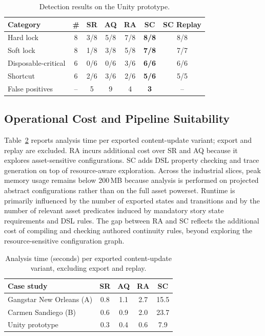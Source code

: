 \documentclass[conference]{IEEEtran}
\begin{document}
\begin{table}[t]
  \caption{Detection results on the Unity prototype.}
  \label{tab:results-proto}
  \centering
  \scriptsize
  \setlength{\tabcolsep}{3pt}
  \begin{tabular}{lcccccc}
    \toprule
    Category & \# & SR & AQ & RA & \textbf{SC} & SC Replay \\
    \midrule
    Hard lock           & 8 & 3/8 & 5/8 & 7/8 & \textbf{8/8} & 8/8 \\
    Soft lock           & 8 & 1/8 & 3/8 & 5/8 & \textbf{7/8} & 7/7 \\
    Disposable-critical & 6 & 0/6 & 0/6 & 3/6 & \textbf{6/6} & 6/6 \\
    Shortcut            & 6 & 2/6 & 3/6 & 2/6 & \textbf{5/6} & 5/5 \\
    \midrule
    False positives     & -- & 5   & 9   & 4   & \textbf{3}   & --  \\
    \bottomrule
  \end{tabular}
\end{table}

\subsection{Operational Cost and Pipeline Suitability}
\label{sec:cost}

Table~\ref{tab:cost} reports analysis time per exported content-update
variant; export and replay are excluded. RA incurs additional cost over SR and
AQ because it explores asset-sensitive configurations. SC adds DSL
property checking and trace generation on top of resource-aware
exploration. Across the industrial slices, peak memory usage remains below
200\,MB because analysis is performed on projected abstract
configurations rather than on the full asset powerset. Runtime is primarily influenced by the number of exported
states and transitions and by the number of relevant asset predicates
induced by mandatory story state requirements and DSL rules. The gap
between RA and SC reflects the additional cost of compiling and checking
authored continuity rules, beyond exploring the resource-sensitive
configuration graph.

\begin{table}[t]
  \caption{Analysis time (seconds) per exported content-update variant, excluding export and replay.}
  \label{tab:cost}
  \centering
  \begin{tabular}{lcccc}
    \toprule
    Case study & SR & AQ & RA & SC \\
    \midrule
    Gangstar New Orleans (A) & 0.8 & 1.1 & 2.7 & 15.5 \\
    Carmen Sandiego (B)      & 0.6 & 0.9 & 2.0 & 23.7 \\
    Unity prototype          & 0.3 & 0.4 & 0.6 & 7.9 \\
    \bottomrule
  \end{tabular}
\end{table}
\end{document}
